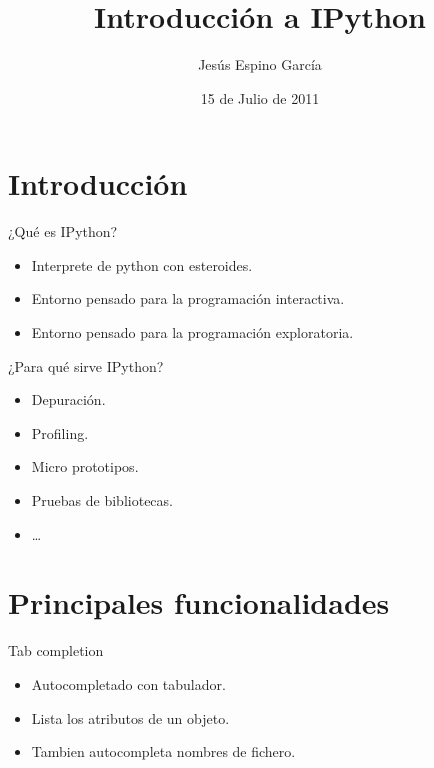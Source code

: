 \documentclass[10pt]{beamer}
\title{Introducción a IPython}
\author{Jesús Espino García}
\date{15 de Julio de 2011}
\institute[Python Madrid 2011]{Kaleidos\\Python Madrid 2011}
\begin{document}
  \frame{\maketitle}


  \section*{Introducción}
  \begin{frame}{¿Qué es IPython?}
    \begin{itemize}
      \item Interprete de python con esteroides.
      \item Entorno pensado para la programación interactiva.
      \item Entorno pensado para la programación exploratoria.
    \end{itemize}
  \end{frame}
  
  \begin{frame}{¿Para qué sirve IPython?}
    \begin{itemize}
      \item Depuración.
      \item Profiling.
      \item Micro prototipos.
      \item Pruebas de bibliotecas.
      \item \dots{}
    \end{itemize}
  \end{frame}
  
  \section*{Principales funcionalidades}
  \begin{frame}{Tab completion}
    \begin{itemize}
      \item Autocompletado con tabulador.
      \item Lista los atributos de un objeto.
      \item Tambien autocompleta nombres de fichero.
    \end{itemize}
  \end{frame}
\end{document}
